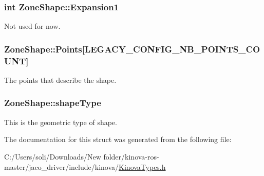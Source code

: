 \subsubsection[{\texorpdfstring{Expansion1}{Expansion1}}]{\setlength{\rightskip}{0pt plus 5cm}int Zone\+Shape\+::\+Expansion1}\hypertarget{struct_zone_shape_a832ceb07cfc73a4cddb499228892b13d}{}\label{struct_zone_shape_a832ceb07cfc73a4cddb499228892b13d}


Not used for now. 

\subsubsection[{\texorpdfstring{Points}{Points}}]{ Zone\+Shape\+::\+Points\mbox{[}{\bf L\+E\+G\+A\+C\+Y\+\_\+\+C\+O\+N\+F\+I\+G\+\_\+\+N\+B\+\_\+\+P\+O\+I\+N\+T\+S\+\_\+\+C\+O\+U\+NT}\mbox{]}}\hypertarget{struct_zone_shape_a49c0935a78506729b3f7143771ddc345}{}\label{struct_zone_shape_a49c0935a78506729b3f7143771ddc345}


The points that describe the shape. 

\subsubsection[{\texorpdfstring{shape\+Type}{shapeType}}]{ Zone\+Shape\+::shape\+Type}\hypertarget{struct_zone_shape_aeeded22d6312c356295b896f5e42805a}{}\label{struct_zone_shape_aeeded22d6312c356295b896f5e42805a}


This is the geometric type of shape. 



The documentation for this struct was generated from the following file\+:\begin{DoxyCompactItemize}
\item 
C\+:/\+Users/soli/\+Downloads/\+New folder/kinova-\/ros-\/master/jaco\+\_\+driver/include/kinova/\hyperlink{_kinova_types_8h}{Kinova\+Types.\+h}\end{DoxyCompactItemize}
